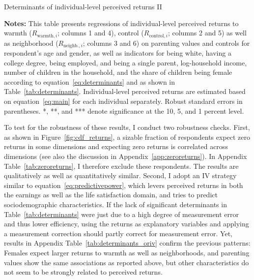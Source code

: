 \documentclass[12pt, a4paper, english]{article}
\begin{document}
\begin{table}[h!]\centering
    \caption{Determinants of individual-level perceived returns II}\label{tab:determinants_parentingvalues}
    \resizebox{0.7\textwidth}{!}{
         
    }
    \vspace{0.5em}
    \caption*{\footnotesize \textbf{Notes:} This table presents regressions of individual-level perceived returns to warmth ($R_{\text{warmth},i}$; columns 1 and 4), control ($R_{\text{control},i}$; columns 2 and 5) as well as neighborhood ($R_{\text{neighb.},i}$; columns 3 and 6) on parenting values and controls for respondent's age and gender, as well as indicators for being white, having a college degree, being employed, and being a single parent, log-household income, number of children in the household, and the share of children being female according to equation~\eqref{eq:determinants} and as shown in Table~\ref{tab:determinants}. Individual-level perceived returns are estimated based on equation~\eqref{eq:main} for each individual separately. Robust standard errors in parentheses. *, **, and *** denote significance at the 10, 5, and 1 percent level.}
\end{table}

To test for the robustness of these results, I conduct two robustness checks. First, as shown in Figure~\ref{fig:cdf_returns}, a sizable fraction of respondents expect zero returns in some dimensions and expecting zero returns is correlated across dimensions (see also the discussion in Appendix~\ref{app:zeroreturns}). In Appendix Table~\ref{tab:zeroreturns}, I therefore exclude these respondents. The results are qualitatively as well as quantitatively similar. 
Second, I adopt an IV strategy similar to equation~\eqref{eq:predictivepower}, which levers perceived returns in both the earnings as well as the life satisfaction domain, and tries to predict sociodemographic characteristics. If the lack of significant determinants in Table~\ref{tab:determinants} were just due to a high degree of measurement error and thus lower efficiency, using the returns as explanatory variables and applying a measurement correction should partly correct for measurement error. Yet, results in Appendix Table~\ref{tab:determinants_oriv} confirm the previous patterns: Females expect larger returns to warmth as well as neighborhoods, and parenting values show the same associations as reported above, but other characteristics do not seem to be strongly related to perceived returns.
\end{document}
